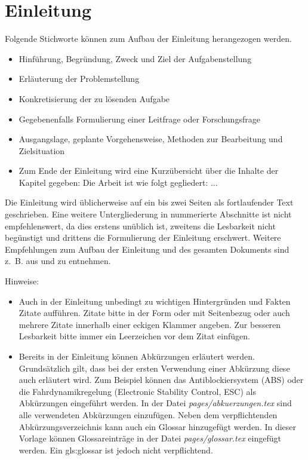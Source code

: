 \chapter{Einleitung}
\label{cha:Einleitung}

Folgende Stichworte können zum Aufbau der Einleitung herangezogen werden.

\begin{itemize}
\item Hinführung, Begründung, Zweck und Ziel der Aufgabenstellung
\item Erläuterung der Problemstellung
\item Konkretisierung der zu lösenden Aufgabe
\item Gegebenenfalls Formulierung einer Leitfrage oder Forschungsfrage
\item Ausgangslage, geplante Vorgehensweise, Methoden zur Bearbeitung und Zielsituation
\item Zum Ende der Einleitung wird eine Kurzübersicht über die Inhalte der Kapitel gegeben: \glqq Die Arbeit ist wie folgt gegliedert: ...\grqq
\end{itemize}

Die Einleitung wird üblicherweise auf ein bis zwei Seiten als fortlaufender Text geschrieben. Eine weitere Untergliederung in nummerierte Abschnitte ist nicht empfehlenswert, da dies erstens unüblich ist, zweitens die Lesbarkeit nicht begünstigt und drittens die Formulierung der Einleitung erschwert. Weitere Empfehlungen zum Aufbau der Einleitung und des gesamten Dokuments sind z.~B. aus \autocite{DHBW.2021} und \autocite{Lindenlauf.2022} zu entnehmen.

\clearpage

Hinweise: 

\begin{itemize}
\item Auch in der Einleitung unbedingt zu wichtigen Hintergründen und Fakten Zitate aufführen. Zitate bitte in der Form \autocite{Tipler.2019} oder mit Seitenbezug \autocite[66]{Ziegler.2017} oder auch mehrere Zitate  \autocite{Tipler.2019, Ziegler.2017} innerhalb einer eckigen Klammer angeben. Zur besseren Lesbarkeit bitte immer ein Leerzeichen vor dem Zitat einfügen.
	
\item Bereits in der Einleitung können Abkürzungen erläutert werden. Grundsätzlich gilt, dass bei der ersten Verwendung einer Abkürzung diese auch erläutert wird. Zum Beispiel können das Antiblockiersystem (ABS) oder die Fahrdynamikregelung (Electronic Stability Control, ESC) als Abkürzungen eingeführt werden. In der Datei \textit{pages/abkuerzungen.tex} sind alle verwendeten Abkürzungen einzufügen. Neben dem verpflichtenden Abkürzungsverzeichnis kann auch ein Glossar hinzugefügt werden. In dieser Vorlage können Glossareinträge in der Datei \textit{pages/glossar.tex} eingefügt werden. Ein \Gls{gls:glossar} ist jedoch nicht verpflichtend.
\end{itemize}

